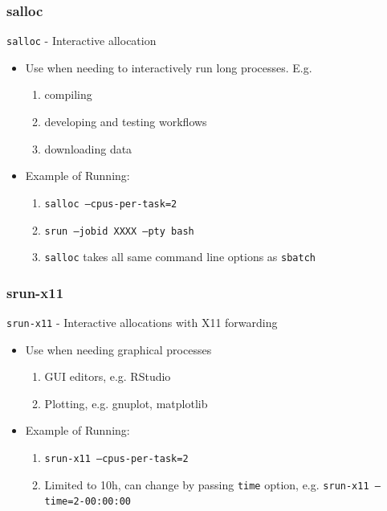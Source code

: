 \documentclass{beamer}
\newcommand{\code}[1]{\colorbox{codegray}{\texttt{#1}}}
\begin{document}
\begin{frame}
\frametitle{salloc}
\code{salloc} - Interactive allocation 
\bigskip
\begin{itemize}
    \item Use when needing to interactively run long processes. E.g.
        \begin{enumerate}
            \item compiling
            \bigskip
            \pause 
            \item developing and testing workflows
            \bigskip
            \pause 
            \item downloading data
            \bigskip
            \pause 
        \end{enumerate}
    \pause
    \pause
    
    \item Example of Running:
    \bigskip
    \begin{enumerate}
        \item \code{salloc --cpus-per-task=2}
        \bigskip
        \item \code{srun  --jobid XXXX --pty bash}
        \pause
        \bigskip
        \item \code{salloc} takes all same command line options as \code{sbatch}
    \end{enumerate}
\end{itemize}
\end{frame}


\begin{frame}
\frametitle{srun-x11}
\code{srun-x11} - Interactive allocations with X11 forwarding
\bigskip
\begin{itemize}
    \item Use when needing graphical processes
        \bigskip
        \begin{enumerate}
            \item GUI editors, e.g. RStudio
            \bigskip
            \pause 
            \item Plotting, e.g. gnuplot, matplotlib
            \bigskip
        \end{enumerate}
    \pause
    \item Example of Running:
    \bigskip
    \begin{enumerate}
        \item \code{srun-x11 --cpus-per-task=2}
        \bigskip
        \pause
        \item Limited to 10h, can change by passing \code{time} option, e.g. \code{srun-x11 --time=2-00:00:00}
    \end{enumerate}
\end{itemize}
\end{frame}
\end{document}
